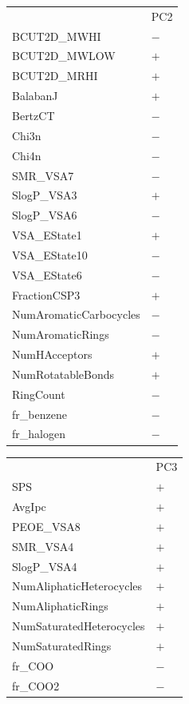 \documentclass[12pt, a4paper]{article}
\begin{document}
\begin{table}[ht!]
\begin{tabular}[t]{ll}
                & PC2 \\
                BCUT2D\_MWHI & $-$ \\
                BCUT2D\_MWLOW & $+$ \\
                BCUT2D\_MRHI & $+$ \\
                BalabanJ & $+$ \\
                BertzCT & $-$ \\
                Chi3n & $-$ \\
                Chi4n & $-$ \\
                SMR\_VSA7 & $-$ \\
                SlogP\_VSA3 & $+$ \\
                SlogP\_VSA6 & $-$ \\
                VSA\_EState1 & $+$ \\
                VSA\_EState10 & $-$ \\
                VSA\_EState6 & $-$ \\
                FractionCSP3 & $+$ \\
                NumAromaticCarbocycles & $-$ \\
                NumAromaticRings & $-$ \\
                NumHAcceptors & $+$ \\
                NumRotatableBonds & $+$ \\
                RingCount & $-$ \\
                fr\_benzene & $-$ \\
                fr\_halogen & $-$ \\ 
            \end{tabular}

        \end{table}
            
        \begin{tabular}[ht!]{ll}
            & PC3 \\
            SPS & $+$ \\
            AvgIpc & $+$ \\
            PEOE\_VSA8 & $+$ \\
            SMR\_VSA4 & $+$ \\
            SlogP\_VSA4 & $+$ \\
            NumAliphaticHeterocycles & $+$ \\
            NumAliphaticRings & $+$ \\
            NumSaturatedHeterocycles & $+$ \\
            NumSaturatedRings & $+$ \\
            fr\_COO & $-$ \\
            fr\_COO2 & $-$ \\
        \end{tabular}
        
\end{document}
